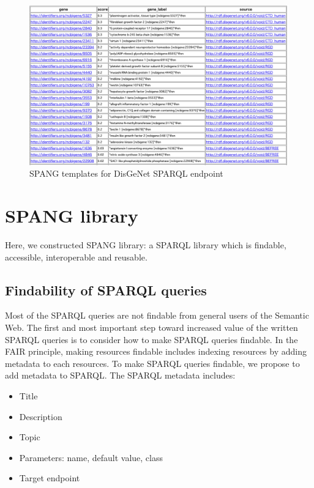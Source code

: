 \documentclass[runningheads]{llncs}
\begin{document}
\begin{figure}
\center
\includegraphics[width=1.0\textwidth]{spang_disease_gene_result.png}
\caption{SPANG templates for DisGeNet SPARQL endpoint}
\label{fig:spang_disease_gene_result}
\end{figure}


\section{SPANG library}

Here, we constructed SPANG library: a SPARQL library which is findable, accessible, interoperable and reusable.

\subsection{Findability of SPARQL queries}
Most of the SPARQL queries are not findable from general users of the Semantic Web. The first and most important step toward increased value of the written SPARQL queries is to consider how to make SPARQL queries findable.
In the FAIR principle, making resources findable includes indexing resources by adding metadata to each resources. 
To make SPARQL queries findable, we propose to add metadata to SPARQL.
The SPARQL metadata includes:
\begin{itemize}
    \item Title
    \item Description
    \item Topic
    \item Parameters: name, default value, class
    \item Target endpoint
\end{itemize}
\end{document}
